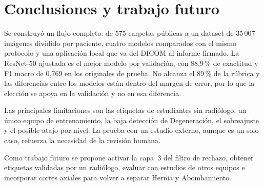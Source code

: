 \section{Conclusiones y trabajo futuro}
\label{sec:conclusiones}

Se construyó un flujo completo: de 575 carpetas públicas a un dataset de 35\,007 imágenes dividido por paciente, cuatro modelos comparados con el mismo protocolo y una aplicación local que va del DICOM al informe firmado. La ResNet-50 ajustada es el mejor modelo por validación, con 88,9\,\% de exactitud y F1 macro de 0,769 en los originales de prueba. No alcanza el 89\,\% de la rúbrica y las diferencias entre los modelos están dentro del margen de error, por lo que la elección se apoya en la validación y no en esa diferencia.

Las principales limitaciones son las etiquetas de estudiantes sin radiólogo, un único equipo de entrenamiento, la baja detección de Degeneración, el sobreajuste y el posible atajo por nivel. La prueba con un estudio externo, aunque es un solo caso, refuerza la necesidad de la revisión humana.

Como trabajo futuro se propone activar la capa~3 del filtro de rechazo, obtener etiquetas validadas por un radiólogo, evaluar con estudios de otros equipos e incorporar cortes axiales para volver a separar Hernia y Abombamiento.
